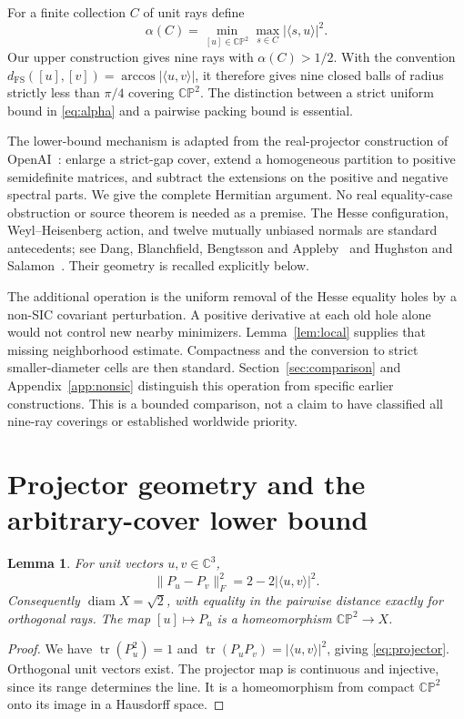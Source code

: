 \documentclass[11pt,a4paper]{article}
\newtheorem{lemma}[theorem]{Lemma}
\theoremstyle{remark}
\numberwithin{equation}{section}
\newcommand{\C}{\mathbb C}
\newcommand{\CP}{\mathbb{CP}}
\newcommand{\tr}{\operatorname{tr}}
\newcommand{\diam}{\operatorname{diam}}
\newcommand{\ip}[2]{\langle #1,#2\rangle}
\newcommand{\norm}[1]{\lVert #1\rVert}
\newcommand{\abs}[1]{\lvert #1\rvert}
\begin{document}
For a finite collection $C$ of unit rays define
\begin{equation}\label{eq:alpha}
 \alpha(C)=\min_{[u]\in\CP^2}\max_{s\in C}\abs{\ip su}^2.
\end{equation}
Our upper construction gives nine rays with $\alpha(C)>1/2$. With the convention $d_{\mathrm{FS}}([u],[v])=\arccos\abs{\ip uv}$, it therefore gives nine closed balls of radius strictly less than $\pi/4$ covering $\CP^2$. The distinction between a strict uniform bound in \eqref{eq:alpha} and a pairwise packing bound is essential.

The lower-bound mechanism is adapted from the real-projector construction of OpenAI~\cite{OpenAI}: enlarge a strict-gap cover, extend a homogeneous partition to positive semidefinite matrices, and subtract the extensions on the positive and negative spectral parts. We give the complete Hermitian argument. No real equality-case obstruction or source theorem is needed as a premise. The Hesse configuration, Weyl--Heisenberg action, and twelve mutually unbiased normals are standard antecedents; see Dang, Blanchfield, Bengtsson and Appleby~\cite{Dang} and Hughston and Salamon~\cite{HS}. Their geometry is recalled explicitly below.

The additional operation is the uniform removal of the Hesse equality holes by a non-SIC covariant perturbation. A positive derivative at each old hole alone would not control new nearby minimizers. Lemma~\ref{lem:local} supplies that missing neighborhood estimate. Compactness and the conversion to strict smaller-diameter cells are then standard. Section~\ref{sec:comparison} and Appendix~\ref{app:nonsic} distinguish this operation from specific earlier constructions. This is a bounded comparison, not a claim to have classified all nine-ray coverings or established worldwide priority.

\section{Projector geometry and the arbitrary-cover lower bound}
\begin{lemma}\label{lem:geometry}
For unit vectors $u,v\in\C^3$,
\begin{equation}\label{eq:projector}
 \norm{P_u-P_v}_F^2=2-2\abs{\ip uv}^2.
\end{equation}
Consequently $\diam X=\sqrt2$, with equality in the pairwise distance exactly for orthogonal rays. The map $[u]\mapsto P_u$ is a homeomorphism $\CP^2\to X$.
\end{lemma}
\begin{proof}
We have $\tr(P_u^2)=1$ and $\tr(P_uP_v)=\abs{\ip uv}^2$, giving \eqref{eq:projector}. Orthogonal unit vectors exist. The projector map is continuous and injective, since its range determines the line. It is a homeomorphism from compact $\CP^2$ onto its image in a Hausdorff space.
\end{proof}
\end{document}

